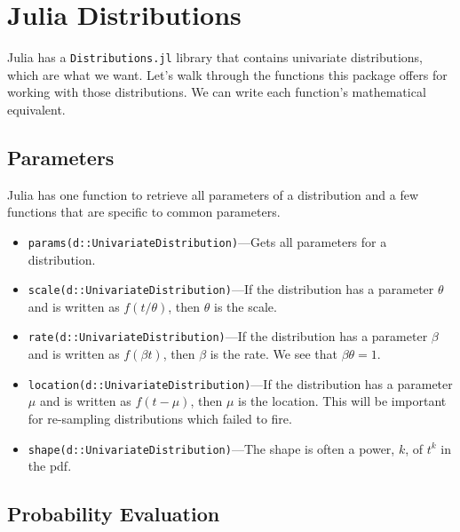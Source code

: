 \documentclass{article}
\begin{document}
\section{Julia Distributions}
Julia has a \texttt{Distributions.jl} library that contains univariate distributions, which are what we want. Let's walk through the functions this package offers for working with those distributions. We can write each function's mathematical equivalent.

\subsection{Parameters}
Julia has one function to retrieve all parameters of a distribution and a few functions that are specific to common parameters.

\begin{itemize}
	\item \texttt{params(d::UnivariateDistribution)}---Gets all parameters for a distribution.
	\item \texttt{scale(d::UnivariateDistribution)}---If the distribution has a parameter $\theta$ and is written as $f(t/\theta)$, then $\theta$ is the scale.
	\item \texttt{rate(d::UnivariateDistribution)}---If the distribution has a parameter $\beta$ and is written as $f(\beta t)$, then $\beta$ is the rate. We see that $\beta\theta = 1$.
	\item \texttt{location(d::UnivariateDistribution)}---If the distribution has a parameter $\mu$ and is written as $f(t-\mu)$, then $\mu$ is the location. This will be important for re-sampling distributions which failed to fire.
	\item \texttt{shape(d::UnivariateDistribution)}---The shape is often a power, $k$, of $t^k$ in the pdf.
\end{itemize}

\subsection{Probability Evaluation}
\end{document}
